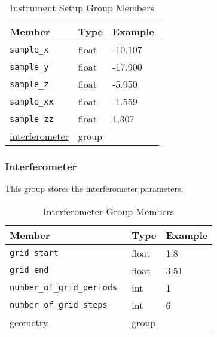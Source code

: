\begin{table}[h!]\sffamily \footnotesize
\caption{Instrument Setup Group Members}
\centering
{}
\begin{tabular}{l l l}

\toprule
\bfseries Member     & \bfseries Type & \bfseries Example \\
\midrule
\tt{sample\_x} & float & -10.107 \\
\tt{sample\_y} & float &  -17.900\\
\tt{sample\_z} & float & -5.950 \\
\tt{sample\_xx} & float & -1.559\\
\tt{sample\_zz} & float & 1.307 \\
\hyperref[tomo:interferometer]{interferometer} &  group & \\
\bottomrule
\end{tabular}
\label{table:tomo:instrument:setup}
\end{table}

\subsubsection{Interferometer}
\label{tomo:interferometer}

This group stores the interferometer parameters.

\begin{table}[h!]\sffamily \footnotesize
\caption{Interferometer Group Members}
\centering
{}
\begin{tabular}{l l l}

\toprule
\bfseries Member     & \bfseries Type & \bfseries Example \\
\midrule
\tt{grid\_start} & float & 1.8 \\
\tt{grid\_end} & float  & 3.51 \\ 
\tt{number\_of\_grid\_periods} & int  & 1    \\
\tt{number\_of\_grid\_steps} & int  & 6    \\
\hyperref[tomo:geometry]{geometry} &  group & \\
\bottomrule
\end{tabular}
\label{table:tomo:instrument:setup:interferometer}
\end{table}




